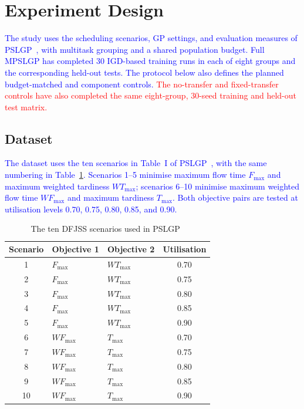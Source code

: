 \documentclass[10pt,journal]{IEEEtran}
\newcommand{\revision}[1]{\textcolor{blue}{#1}}
\newcommand{\ablationrevision}[1]{\textcolor{red}{#1}}
\begin{document}
\section{Experiment Design}
\label{sec:experiment-design}
\revision{The study uses the scheduling scenarios, GP settings, and evaluation measures of PSLGP~\cite{xu2026pslgp}, with multitask grouping and a shared population budget. Full MPSLGP has completed 30 IGD-based training runs in each of eight groups and the corresponding held-out tests. The protocol below also defines the planned budget-matched and component controls.}
\ablationrevision{The no-transfer and fixed-transfer controls have also completed the same eight-group, 30-seed training and held-out test matrix.}

\subsection{Dataset}
\revision{The dataset uses the ten scenarios in Table~I of PSLGP~\cite{xu2026pslgp}, with the same numbering in Table~\ref{tab:pslgp-scenarios}. Scenarios 1--5 minimise maximum flow time $F_{\max}$ and maximum weighted tardiness $WT_{\max}$; scenarios 6--10 minimise maximum weighted flow time $WF_{\max}$ and maximum tardiness $T_{\max}$. Both objective pairs are tested at utilisation levels 0.70, 0.75, 0.80, 0.85, and 0.90.}

\begin{table}[t]
\centering
\caption{The ten DFJSS scenarios used in PSLGP~\cite{xu2026pslgp}}
\label{tab:pslgp-scenarios}
\footnotesize
\begin{tabular}{cllc}
\toprule
Scenario & Objective 1 & Objective 2 & Utilisation \\
\midrule
1 & $F_{\max}$ & $WT_{\max}$ & 0.70 \\
2 & $F_{\max}$ & $WT_{\max}$ & 0.75 \\
3 & $F_{\max}$ & $WT_{\max}$ & 0.80 \\
4 & $F_{\max}$ & $WT_{\max}$ & 0.85 \\
5 & $F_{\max}$ & $WT_{\max}$ & 0.90 \\
\midrule
6 & $WF_{\max}$ & $T_{\max}$ & 0.70 \\
7 & $WF_{\max}$ & $T_{\max}$ & 0.75 \\
8 & $WF_{\max}$ & $T_{\max}$ & 0.80 \\
9 & $WF_{\max}$ & $T_{\max}$ & 0.85 \\
10 & $WF_{\max}$ & $T_{\max}$ & 0.90 \\
\bottomrule
\end{tabular}
\end{table}
\end{document}
